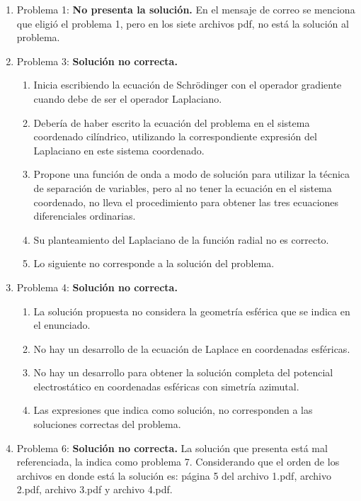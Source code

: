 \begin{enumerate}
\item Problema 1: \textbf{No presenta la solución.} En el mensaje de correo se menciona que eligió el problema 1, pero en los siete archivos pdf, no está la solución al problema.
\item Problema 3: \textbf{Solución no correcta.}
\begin{enumerate}[label=\roman*)]
\item Inicia escribiendo la ecuación de Schrödinger con el operador gradiente cuando debe de ser el operador Laplaciano.
\item Debería de haber escrito la ecuación del problema en el sistema coordenado cilíndrico, utilizando la correspondiente expresión del Laplaciano en este sistema coordenado.
\item Propone una función de onda a modo de solución para utilizar la técnica de separación de variables, pero al no tener la ecuación en el sistema coordenado, no lleva el procedimiento para obtener las tres ecuaciones diferenciales ordinarias.
\item Su planteamiento del Laplaciano de la función radial no es correcto.
\item Lo siguiente no corresponde a la solución del problema.
\end{enumerate}
\item Problema 4: \textbf{Solución no correcta.}
\begin{enumerate}[label=\roman*)]
\item La solución propuesta no considera la geometría esférica que se indica en el enunciado.
\item No hay un desarrollo de la ecuación de Laplace en coordenadas esféricas.
\item No hay un desarrollo para obtener la solución completa del potencial electrostático en coordenadas esféricas con simetría azimutal.
\item Las expresiones que indica como solución, no corresponden a las soluciones correctas del problema.
\end{enumerate}
\item Problema 6: \textbf{Solución no correcta.} La solución que presenta está mal referenciada, la indica como problema 7. Considerando que el orden de los archivos en donde está la solución es: página 5 del archivo 1.pdf, archivo 2.pdf, archivo 3.pdf y archivo 4.pdf.
\end{enumerate}

